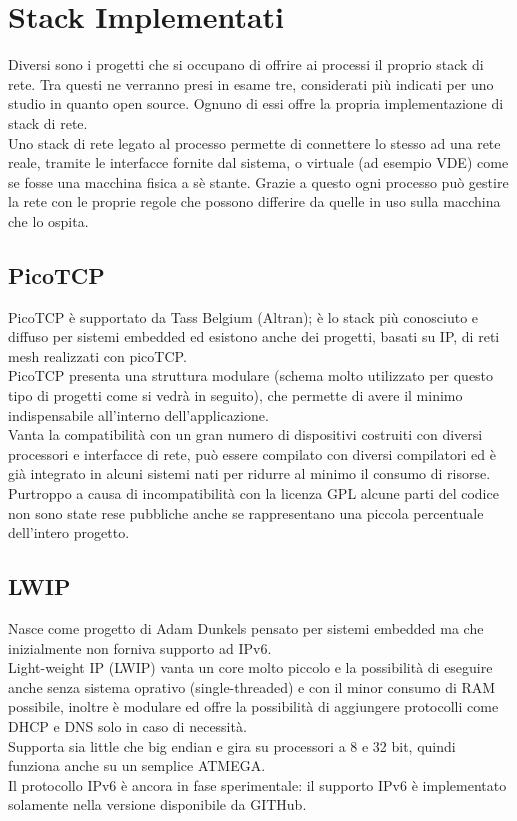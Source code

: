 \section{Stack Implementati}
Diversi sono i progetti che si occupano di offrire ai processi il proprio stack di rete. Tra questi ne verranno presi in esame tre, considerati pi\`u indicati per uno studio in quanto open source. Ognuno di essi offre la propria implementazione di stack di rete.\\
Uno stack di rete legato al processo permette di connettere lo stesso ad una rete reale, tramite le interfacce fornite dal sistema, o virtuale (ad esempio VDE) come se fosse una macchina fisica a s\`e stante. Grazie a questo ogni processo pu\`o gestire la rete con le proprie regole che possono differire da quelle in uso sulla macchina che lo ospita.

\subsection{PicoTCP}
PicoTCP\cite{K4} \`e supportato da Tass Belgium (Altran); \`e lo stack pi\`u conosciuto e diffuso per sistemi embedded ed esistono anche dei progetti, basati su IP, di reti mesh realizzati con picoTCP\cite{K14}.\\
PicoTCP presenta una struttura modulare (schema molto utilizzato per questo tipo di progetti come si vedr\`a in seguito), che permette di avere il minimo indispensabile all'interno dell'applicazione.\\
Vanta la compatibilit\`a con un gran numero di dispositivi costruiti con diversi processori e interfacce di rete, pu\`o essere compilato con diversi compilatori ed \`e gi\`a integrato in alcuni sistemi nati per ridurre al minimo il consumo di risorse.\\
Purtroppo a causa di incompatibilit\`a con la licenza GPL alcune parti del codice non sono state rese pubbliche anche se rappresentano una piccola percentuale dell'intero progetto.
\subsection{LWIP}
Nasce come progetto di Adam Dunkels pensato per sistemi embedded ma che inizialmente non forniva supporto ad IPv6.\\
Light-weight IP (LWIP\cite{K13}) vanta un core molto piccolo e la possibilit\`a di eseguire anche senza sistema oprativo (single-threaded) e con il minor consumo di RAM possibile, inoltre \`e modulare ed offre la possibilit\`a di aggiungere protocolli come DHCP e DNS solo in caso di necessit\`a.\\
Supporta sia little che big endian e gira su processori a 8 e 32 bit, quindi funziona anche su un semplice ATMEGA.\\
Il protocollo IPv6 \`e ancora in fase sperimentale: il supporto IPv6 \`e implementato solamente nella versione disponibile da GITHub.
